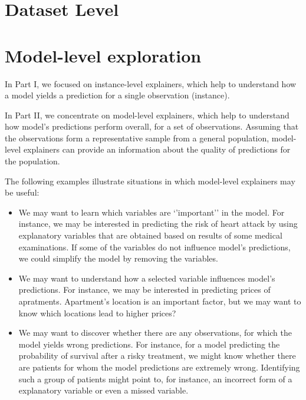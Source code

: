 \documentclass[12pt,]{krantz}
\providecommand{\tightlist}{%
  \setlength{\itemsep}{0pt}\setlength{\parskip}{0pt}}
\begin{document}
\hypertarget{dataset-level}{%
\section*{Dataset Level}\label{dataset-level}}

\hypertarget{modelLevelExploration}{%
\section{Model-level exploration}\label{modelLevelExploration}}

In Part I, we focused on instance-level explainers, which help to understand how a model yields a prediction for a single observation (instance).

In Part II, we concentrate on model-level explainers, which help to understand how model's predictions perform overall, for a set of observations. Assuming that the observations form a representative sample from a general population, model-level explainers can provide an information about the quality of predictions for the population.

The following examples illustrate situations in which model-level explainers may be useful:

\begin{itemize}
\tightlist
\item
  We may want to learn which variables are `'important'' in the model. For instance, we may be interested in predicting the risk of heart attack by using explanatory variables that are obtained based on results of some medical examinations. If some of the variables do not influence model's predictions, we could simplify the model by removing the variables.
\item
  We may want to understand how a selected variable influences model's predictions. For instance, we may be interested in predicting prices of apratments. Apartment's location is an important factor, but we may want to know which locations lead to higher prices?
\item
  We may want to discover whether there are any observations, for which the model yields wrong predictions. For instance, for a model predicting the probability of survival after a risky treatment, we might know whether there are patients for whom the model predictions are extremely wrong. Identifying such a group of patients might point to, for instance, an incorrect form of a explanatory variable or even a missed variable.
\end{itemize}
\end{document}
